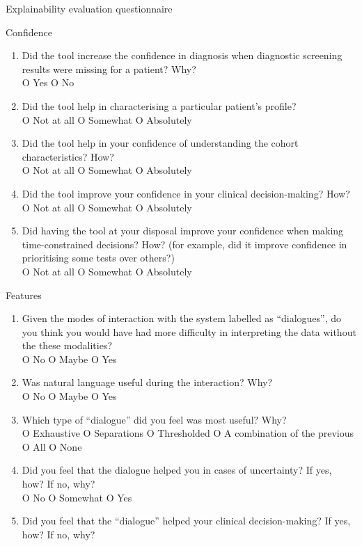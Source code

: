 \begin{framed}
	\begin{center}
		{\huge Explainability evaluation questionnaire}
	\end{center}
	{\Large Confidence}
	\begin{enumerate} 
		\item Did the tool increase the confidence in diagnosis when diagnostic screening results were missing for a patient?  Why? \\
		O Yes O No
		\item Did the tool help in characterising a particular patient's profile? \\
		O Not at all O Somewhat O Absolutely
		\item Did the tool help in your confidence of understanding the cohort characteristics?  How? \\
		O Not at all O Somewhat O Absolutely
		\item Did the tool improve your confidence in your clinical decision-making?  How? \\ 
		O Not at all O Somewhat O Absolutely
		\item Did having the tool at your disposal improve your confidence when making time-constrained decisions?  How? (for example, did it improve confidence in prioritising some tests over others?) \\
		O Not at all O Somewhat O Absolutely
	\end{enumerate}
	{\Large Features}
	\begin{enumerate}[resume]
		\item Given the modes of interaction with the system labelled as \enquote{dialogues}, do you think you would have had more difficulty in interpreting the data without the these modalities? \\
		O No O Maybe O Yes
		\item Was natural language useful during the interaction?  Why? \\
		O No O Maybe O Yes
		\item Which type of \enquote{dialogue} did you feel was most useful? Why? \\
		O Exhaustive O Separations O Thresholded O A combination of the previous O All O None
		\item Did you feel that the dialogue helped you in cases of uncertainty?  If yes, how?  If no, why? \\
		O No O Somewhat O Yes
		\item Did you feel that the \enquote{dialogue} helped your clinical decision-making?  If yes, how?  If no, why? \\

\end{enumerate}
\end{framed}
